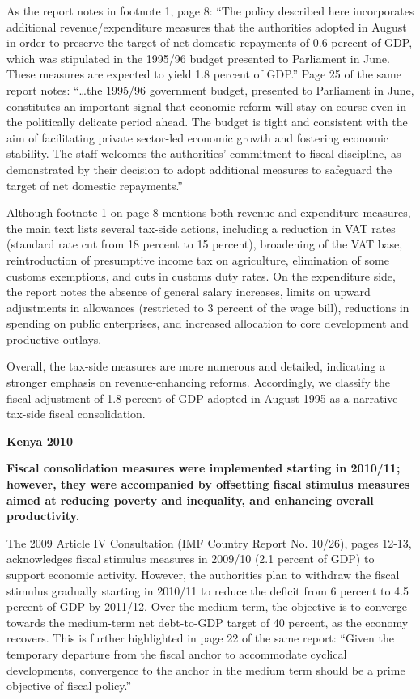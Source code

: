 As the report notes in footnote 1, page 8: “The policy described here incorporates additional revenue/expenditure measures that the authorities adopted in August in order to preserve the target of net domestic repayments of 0.6 percent of GDP, which was stipulated in the 1995/96 budget presented to Parliament in June. These measures are expected to yield 1.8 percent of GDP.” Page 25 of the same report notes: “…the 1995/96 government budget, presented to Parliament in June, constitutes an important signal that economic reform will stay on course even in the politically delicate period ahead. The budget is tight and consistent with the aim of facilitating private sector-led economic growth and fostering economic stability. The staff welcomes the authorities’ commitment to fiscal discipline, as demonstrated by their decision to adopt additional measures to safeguard the target of net domestic repayments.”

Although footnote 1 on page 8 mentions both revenue and expenditure measures, the main text lists several tax-side actions, including a reduction in VAT rates (standard rate cut from 18 percent to 15 percent), broadening of the VAT base, reintroduction of presumptive income tax on agriculture, elimination of some customs exemptions, and cuts in customs duty rates. On the expenditure side, the report notes the absence of general salary increases, limits on upward adjustments in allowances (restricted to 3 percent of the wage bill), reductions in spending on public enterprises, and increased allocation to core development and productive outlays. 

Overall, the tax-side measures are more numerous and detailed, indicating a stronger emphasis on revenue-enhancing reforms. Accordingly, we classify the fiscal adjustment of 1.8 percent of GDP adopted in August 1995 as a narrative tax-side fiscal consolidation.

\textbf{\underline{Kenya 2010}}

\textbf{Fiscal consolidation measures were implemented starting in 2010/11; however, they were accompanied by offsetting fiscal stimulus measures aimed at reducing poverty and inequality, and enhancing overall productivity.} 

The 2009 Article IV Consultation (IMF Country Report No. 10/26), pages 12-13, acknowledges fiscal stimulus measures in 2009/10 (2.1 percent of GDP) to support economic activity. However, the authorities plan to withdraw the fiscal stimulus gradually starting in 2010/11 to reduce the deficit from 6 percent to 4.5 percent of GDP by 2011/12. Over the medium term, the objective is to converge towards the medium-term net debt-to-GDP target of 40 percent, as the economy recovers. This is further highlighted in page 22 of the same report: “Given the temporary departure from the fiscal anchor to accommodate cyclical developments, convergence to the anchor in the medium term should be a prime objective of fiscal policy.”

